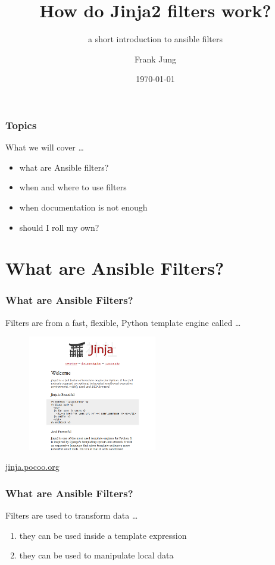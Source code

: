 \documentclass[pdf]{beamer}
\title{How do Jinja2 filters work?}
\subtitle{a short introduction to ansible filters}
\author{Frank Jung}
\institute{frankhjung@linux.com}
\date{ \today }
\begin{document}
\begin{frame}
  \titlepage{}
\end{frame}


\begin{frame}
  \frametitle{Topics}
  What we will cover \ldots
  \pause{}
  \begin{itemize}
    \item<+-> what are Ansible filters?
    \item<+-> when and where to use filters
    \item<+-> when documentation is not enough
    \item<+-> should I roll my own?
  \end{itemize}
\end{frame}

\section{What are Ansible Filters?}

\begin{frame}
  \frametitle{What are Ansible Filters?}
  Filters are from a fast, flexible, Python template engine called \ldots
  \pause{}
  \begin{center}
    \begin{figure}
      \includegraphics[width=0.5\textwidth]{jinja.png}
    \end{figure}
    \href{http://jinja.pocoo.org}{jinja.pocoo.org}
  \end{center}
\end{frame}

\begin{frame}
  \frametitle{What are Ansible Filters?}
  Filters are used to transform data \ldots
  \pause{}
  \begin{enumerate}
    \item<+->{they can be used inside a template expression}
    \item<+->{they can be used to manipulate local data}
  \end{enumerate}
\end{frame}
\end{document}
